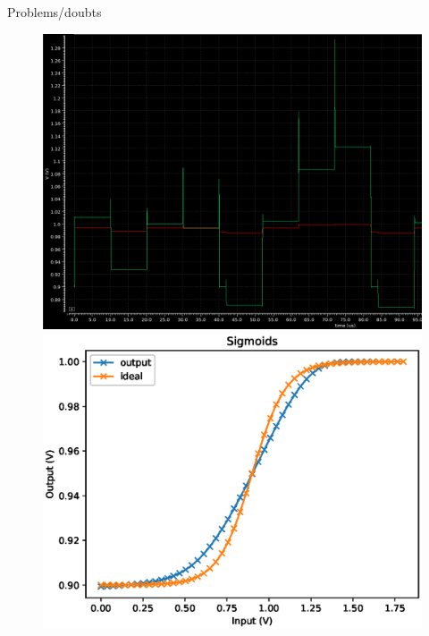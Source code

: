 \documentclass[table]{beamer}
\begin{document}
  \begin{frame}{Problems/doubts}
    \begin{figure}[!tbp]
      \centering
      \begin{minipage}[b]{0.4\textwidth}
        \centering
        \includegraphics[width=\textwidth]{fulltrial1/sigmoid-prob.png}
      \end{minipage}
      \hspace{20pt}
      \begin{minipage}[b]{0.4\textwidth}
        \centering
        \includegraphics[width=\textwidth]{activation/sigmoid}
      \end{minipage}
    \end{figure}
  \end{frame}
\end{document}
